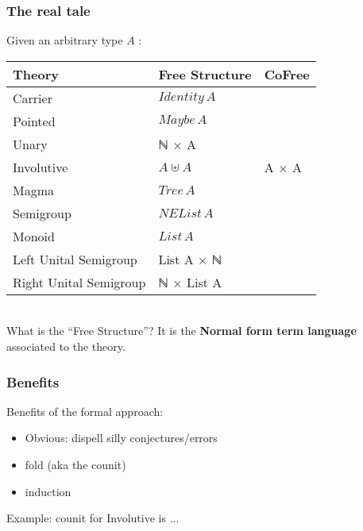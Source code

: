 \documentclass[serif,mathserif,professionalfont,10pt]{beamer}
\begin{document}
\begin{frame}
\frametitle{The real tale}
Given an arbitrary type $A$ : \\ \vspace*{4mm}
\begin{tabular}{lll}
\textbf{Theory} & Free \textbf{Structure} & CoFree \\ \hline
Carrier & $Identity\, A$ & \\
Pointed & $Maybe\, A$ & \\ \hline
Unary & ℕ × A &  \\
Involutive & $A ⊎ A$ & A × A \\ \hline
Magma & $Tree\, A$ &  \\
Semigroup & $NEList\, A$ & \\ \hline
Monoid & $List\, A$ & \\
Left Unital Semigroup & List A × ℕ & \\
Right Unital Semigroup & ℕ × List A & \\ \hline
\end{tabular}\\ \vspace*{4mm}
\pause
What is the ``Free Structure''? It is the
\textbf{Normal form term language} associated to the theory.\\
\end{frame}

\begin{frame}
\frametitle{Benefits}
Benefits of the formal approach:
\begin{itemize}
\item Obvious: dispell silly conjectures/errors
\item fold (aka the counit)
\item induction
\end{itemize} \vspace*{4mm}
\pause
Example: counit for Involutive is ...
\end{frame}
\end{document}

